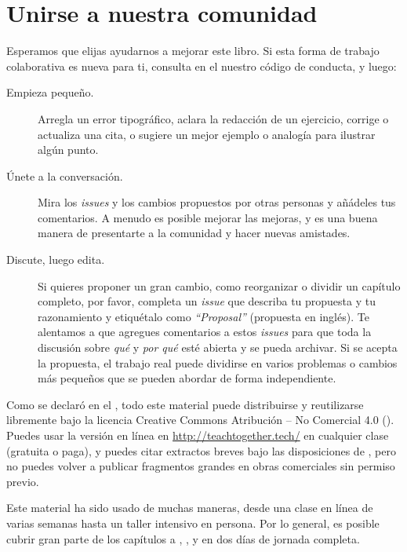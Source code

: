 \chapter{Unirse a nuestra comunidad}\label{s:joining}

Esperamos que elijas ayudarnos a mejorar este libro.
Si esta forma de trabajo colaborativa es nueva para ti,
consulta en el  nuestro código de conducta,
y luego:

\begin{description}

\item[Empieza pequeño.]
  Arregla un error tipográfico,
  aclara la redacción de un ejercicio,
  corrige o actualiza una cita,
  o sugiere un mejor ejemplo o analogía para ilustrar algún punto.

\item[Únete a la conversación.]
  Mira los \emph{issues} y los cambios propuestos por otras personas
  y añádeles tus comentarios.
  A menudo es posible mejorar las mejoras,
  y es una buena manera de presentarte a la comunidad y hacer nuevas amistades.

\item[Discute, luego edita.]
  Si quieres proponer un gran cambio,
  como reorganizar o dividir un capítulo completo,
  por favor, completa un \emph{issue} que describa tu propuesta y tu razonamiento y etiquétalo como  \emph{``Proposal''} (propuesta en inglés).
  Te alentamos a que agregues comentarios a estos \emph{issues}
  para que toda la discusión sobre \emph{qué} y \emph{por qué} esté abierta y se pueda archivar.
  Si se acepta la propuesta,
  el trabajo real puede dividirse en varios problemas o cambios más pequeños
  que se pueden abordar de forma independiente.
\end{description}


Como se declaró en el ,
todo este material puede distribuirse y reutilizarse libremente
bajo la licencia Creative Commons Atribución -- No Comercial 4.0
().
Puedes usar la versión en línea en \url{http://teachtogether.tech/} en cualquier clase (gratuita o paga),
y puedes citar extractos breves bajo las disposiciones de ,
pero no puedes volver a publicar fragmentos grandes en obras comerciales sin permiso previo.

Este material ha sido usado de muchas maneras,
desde una clase en línea de varias semanas hasta un taller intensivo en persona.
Por lo general, es posible cubrir gran parte de los capítulos  a ,
,
y  en dos días de jornada completa.


